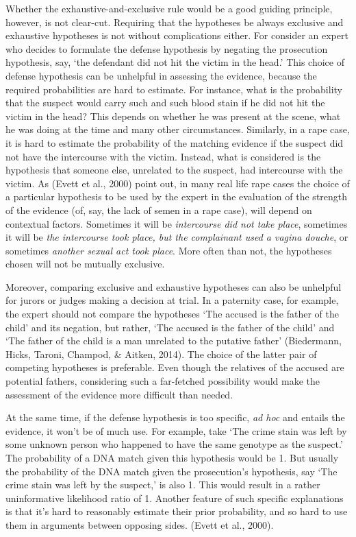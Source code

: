 \documentclass[10pt,dvipsnames,enabledeprecatedfontcommands]{scrartcl}
\begin{document}
Whether the exhaustive-and-exclusive rule would be a good guiding
principle, however, is not clear-cut. Requiring that the hypotheses be
always exclusive and exhaustive hypotheses is not without complications
either. For consider an expert who decides to formulate the defense
hypothesis by negating the prosecution hypothesis, say, `the defendant
did not hit the victim in the head.' This choice of defense hypothesis
can be unhelpful in assessing the evidence, because the required
probabilities are hard to estimate. For instance, what is the
probability that the suspect would carry such and such blood stain if he
did not hit the victim in the head? This depends on whether he was
present at the scene, what he was doing at the time and many other
circumstances. Similarly, in a rape case, it is hard to estimate the
probability of the matching evidence if the suspect did not have the
intercourse with the victim. Instead, what is considered is the
hypothesis that someone else, unrelated to the suspect, had intercourse
with the victim. As (Evett et al., 2000) point out, in many real life
rape cases the choice of a particular hypothesis to be used by the
expert in the evaluation of the strength of the evidence (of, say, the
lack of semen in a rape case), will depend on contextual factors.
Sometimes it will be \emph{intercourse did not take place}, sometimes it
will be
\emph{the intercourse took place, but the complainant used a vagina douche},
or sometimes \emph{another sexual act took place}. More often than not,
the hypotheses chosen will not be mutually exclusive.

Moreover, comparing exclusive and exhaustive hypotheses can also be
unhelpful for jurors or judges making a decision at trial. In a
paternity case, for example, the expert should not compare the
hypotheses `The accused is the father of the child' and its negation,
but rather, `The accused is the father of the child' and `The father of
the child is a man unrelated to the putative father' (Biedermann, Hicks,
Taroni, Champod, \& Aitken, 2014). The choice of the latter pair of
competing hypotheses is preferable. Even though the relatives of the
accused are potential fathers, considering such a far-fetched
possibility would make the assessment of the evidence more difficult
than needed.

At the same time, if the defense hypothesis is too specific,
\textit{ad hoc} and entails the evidence, it won't be of much use. For
example, take `The crime stain was left by some unknown person who
happened to have the same genotype as the suspect.' The probability of a
DNA match given this hypothesis would be 1. But usually the probability
of the DNA match given the prosecution's hypothesis, say `The crime
stain was left by the suspect,' is also 1. This would result in a rather
uninformative likelihood ratio of 1. Another feature of such specific
explanations is that it's hard to reasonably estimate their prior
probability, and so hard to use them in arguments between opposing
sides. (Evett et al., 2000).
\end{document}
